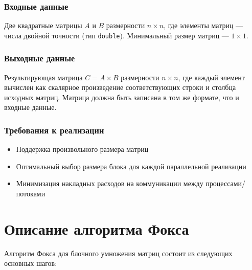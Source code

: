\documentclass[12pt]{article}
\begin{document}
\subsubsection{Входные данные}

Две квадратные матрицы $A$ и $B$ размерности $n \times n$, где элементы матриц --- числа двойной точности (тип \texttt{double}). Минимальный размер матриц --- $1 \times 1$.

\subsubsection{Выходные данные}

Результирующая матрица $C = A \times B$ размерности $n \times n$, где каждый элемент вычислен как скалярное произведение соответствующих строки и столбца исходных матриц. Матрица должна быть записана в том же формате, что и входные данные.

\subsubsection{Требования к реализации}

\begin{itemize}
    \item Поддержка произвольного размера матриц
    \item Оптимальный выбор размера блока для каждой параллельной реализации
    \item Минимизация накладных расходов на коммуникации между процессами/потоками
\end{itemize}

\newpage
\section{Описание алгоритма Фокса}

Алгоритм Фокса для блочного умножения матриц состоит из следующих основных шагов:
\end{document}
